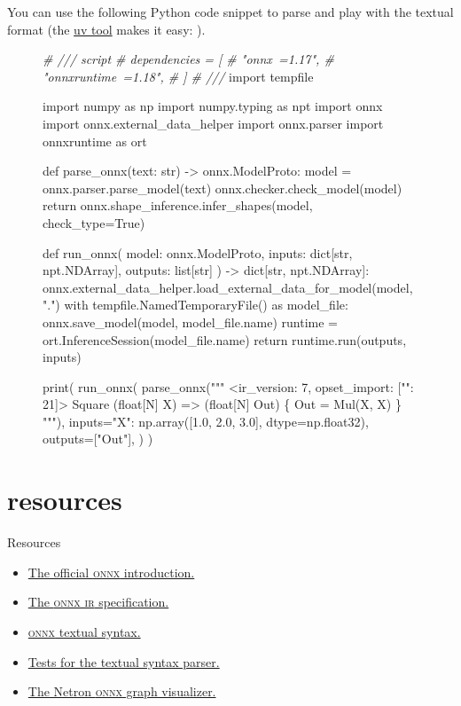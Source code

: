 \documentclass{article}
\begin{document}
You can use the following Python code snippet to parse and play with the textual format
(the \href{https://docs.astral.sh/uv/guides/scripts/#running-scripts}{uv tool} makes it easy: ).

\begin{figure}
\begin{code}[python]
\emph{# /// script
# dependencies = [
#   "onnx~=1.17",
#   "onnxruntime~=1.18",
# ]
# ///}
import tempfile

import numpy as np
import numpy.typing as npt
import onnx
import onnx.external_data_helper
import onnx.parser
import onnxruntime as ort


def parse_onnx(text: str) -> onnx.ModelProto:
    model = onnx.parser.parse_model(text)
    onnx.checker.check_model(model)
    return onnx.shape_inference.infer_shapes(model, check_type=True)


def run_onnx(
    model: onnx.ModelProto, inputs: dict[str, npt.NDArray], outputs: list[str]
) -> dict[str, npt.NDArray]:
    onnx.external_data_helper.load_external_data_for_model(model, ".")
    with tempfile.NamedTemporaryFile() as model_file:
        onnx.save_model(model, model_file.name)
        runtime = ort.InferenceSession(model_file.name)
        return runtime.run(outputs, inputs)


print(
    run_onnx(
        parse_onnx("""\b{
    <ir_version: 7, opset_import: ["": 21]>
    Square (float[N] X) => (float[N] Out) \{
        Out = Mul(X, X)
    \}
    }"""),
        inputs={"X": np.array([1.0, 2.0, 3.0], dtype=np.float32)},
        outputs=["Out"],
    )
)
\end{code}
\end{figure}

\section{resources}{Resources}
\begin{itemize}
\item \href{https://onnx.ai/onnx/intro/index.html}{The official \textsc{onnx} introduction.}
\item \href{https://onnx.ai/onnx/repo-docs/IR.html}{The \textsc{onnx ir} specification.}
\item \href{https://onnx.ai/onnx/repo-docs/Syntax.html}{\textsc{onnx} textual syntax.}
\item \href{https://github.com/onnx/onnx/blob/9fb11e344a7721b2eed1f3e26bf9312f168a79a0/onnx/test/cpp/parser_test.cc}{Tests for the textual syntax parser.}
\item \href{https://netron.app/}{The Netron \textsc{onnx} graph visualizer.}
\end{itemize}

%
%
\end{document}
